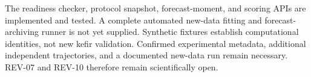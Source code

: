     The readiness checker, protocol snapshot, forecast-moment, and scoring
    APIs are implemented and tested. A complete automated new-data fitting
    and forecast-archiving runner is not yet supplied. Synthetic fixtures
    establish computational identities, not new kefir validation. Confirmed
    experimental metadata, additional independent trajectories, and a
    documented new-data run remain necessary. REV-07 and REV-10 therefore
    remain scientifically open.
